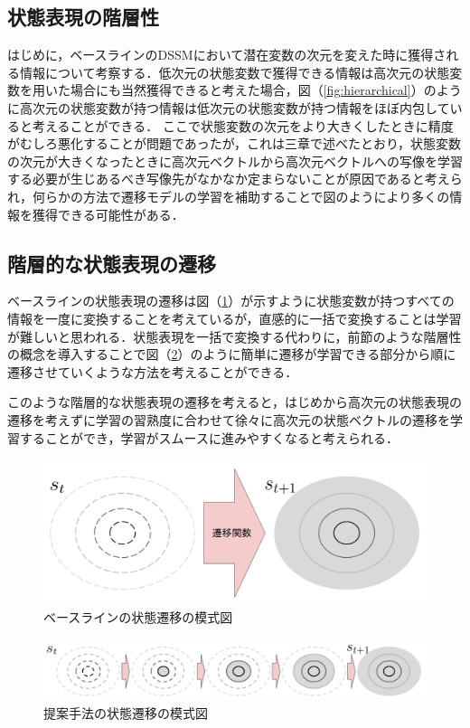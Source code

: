 \subsection{状態表現の階層性}
はじめに，ベースラインのDSSMにおいて潜在変数の次元を変えた時に獲得される情報について考察する．低次元の状態変数で獲得できる情報は高次元の状態変数を用いた場合にも当然獲得できると考えた場合，図（\ref{fig:hierarchical}）のように高次元の状態変数が持つ情報は低次元の状態変数が持つ情報をほぼ内包していると考えることができる．
ここで状態変数の次元をより大きくしたときに精度がむしろ悪化することが問題であったが，これは三章で述べたとおり，状態変数の次元が大きくなったときに高次元ベクトルから高次元ベクトルへの写像を学習する必要が生じあるべき写像先がなかなか定まらないことが原因であると考えられ，何らかの方法で遷移モデルの学習を補助することで図のようにより多くの情報を獲得できる可能性がある．

\subsection{階層的な状態表現の遷移}
ベースラインの状態表現の遷移は図（\ref{fig:transition_base}）が示すように状態変数が持つすべての情報を一度に変換することを考えているが，直感的に一括で変換することは学習が難しいと思われる．状態表現を一括で変換する代わりに，前節のような階層性の概念を導入することで図（\ref{fig:transition_proposal}）のように簡単に遷移が学習できる部分から順に遷移させていくような方法を考えることができる．

このような階層的な状態表現の遷移を考えると，はじめから高次元の状態表現の遷移を考えずに学習の習熟度に合わせて徐々に高次元の状態ベクトルの遷移を学習することができ，学習がスムースに進みやすくなると考えられる．

\begin{figure}[tbp]
  \begin{center}
    \includegraphics[width=0.5\linewidth]{./figures/transition_base.png}
    \caption{ベースラインの状態遷移の模式図}
    \label{fig:transition_base}
  \end{center}
\end{figure}

\begin{figure}[tbp]
  \begin{center}
    \includegraphics[width=0.8\linewidth]{./figures/transition_proposal.png}
    \caption{提案手法の状態遷移の模式図}
    \label{fig:transition_proposal}
  \end{center}
\end{figure}

